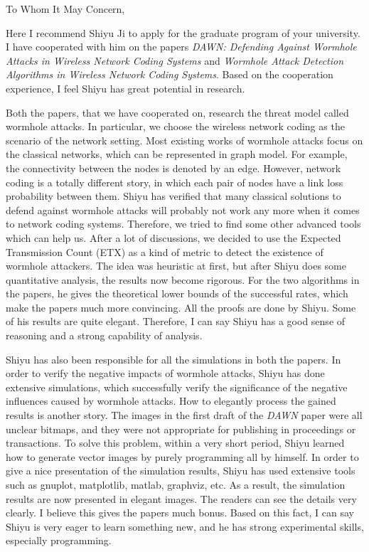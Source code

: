\documentclass{letter}
\begin{document}

To Whom It May Concern,

Here I recommend Shiyu Ji to apply for the graduate program of your university. I have cooperated with him on the papers \emph{DAWN: Defending Against Wormhole Attacks in Wireless Network Coding Systems} and \emph{Wormhole Attack Detection Algorithms in Wireless Network Coding Systems}. Based on the cooperation experience, I feel Shiyu has great potential in research.

Both the papers, that we have cooperated on, research the threat model called wormhole attacks. In particular, we choose the wireless network coding as the scenario of the network setting. Most existing works of wormhole attacks focus on the classical networks, which can be represented in graph model. For example, the connectivity between the nodes is denoted by an edge. However, network coding is a totally different story, in which each pair of nodes have a link loss probability between them. Shiyu has verified that many classical solutions to defend against wormhole attacks will probably not work any more when it comes to network coding systems. Therefore, we tried to find some other advanced tools which can help us. After a lot of discussions, we decided to use the Expected Transmission Count (ETX) as a kind of metric to detect the existence of wormhole attackers. The idea was heuristic at first, but after Shiyu does some quantitative analysis, the results now become rigorous. For the two algorithms in the papers, he gives the theoretical lower bounds of the successful rates, which make the papers much more convincing. All the proofs are done by Shiyu. Some of his results are quite elegant. Therefore, I can say Shiyu has a good sense of reasoning and a strong capability of analysis.

Shiyu has also been responsible for all the simulations in both the papers. In order to verify the negative impacts of wormhole attacks, Shiyu has done extensive simulations, which successfully verify the significance of the negative influences caused by wormhole attacks. How to elegantly process the gained results is another story. The images in the first draft of the \emph{DAWN} paper were all unclear bitmaps, and they were not appropriate for publishing in proceedings or transactions. To solve this problem, within a very short period, Shiyu learned how to generate vector images by purely programming all by himself. In order to give a nice presentation of the simulation results, Shiyu has used extensive tools such as gnuplot, matplotlib, matlab, graphviz, etc. As a result, the simulation results are now presented in elegant images. The readers can see the details very clearly. I believe this gives the papers much bonus. Based on this fact, I can say Shiyu is very eager to learn something new, and he has strong experimental skills, especially programming.
\end{document}
